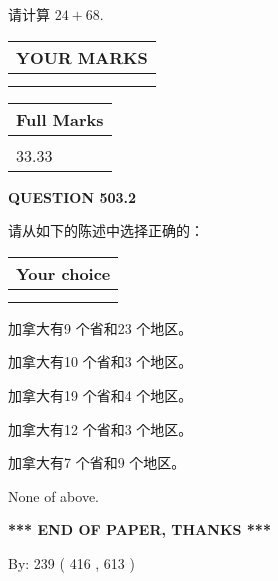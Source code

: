 \documentclass{ctexart}
\begin{document}
  
 
请计算 $ %
24 +  %
68 $.
 

 

 
  
\vspace{0.2in}
  
\noindent\begin{tabular}{|l|}
\hline
 YOUR MARKS  \\
\hline
 \\ 
 \\ 
\hline
\end{tabular}
\hspace{0.05in} \begin{tabular}{|l|}
\hline
 Full Marks  \\
\hline
 \\ 
33.33 \\
\hline
\end{tabular}
{\textbf{\Large{QUESTION
503.2 
}}}
  
  
请从如下的陈述中选择正确的：
  
  
\noindent\hspace{3.0in} \begin{tabular}{|l|}
\hline
Your choice \\
\hline
 \\ 
 \\ 
\hline
\end{tabular}
  
  
 
 
加拿大有9 个省和23 个地区。
 
 
加拿大有10 个省和3 个地区。
 
 
加拿大有19 个省和4 个地区。
 
 
加拿大有12 个省和3 个地区。
 
 
加拿大有7 个省和9 个地区。
 
 
 None of above.
 
 
   
   
 \vspace{0.2in}
 
   
   
   
   
\vspace{1.0in} 
{\textbf{\large{ *** END OF PAPER, THANKS *** }}} 
   
   
\hspace{1.0in} By: 
 239 ( 416 ,  613 )
   
\end{document}
